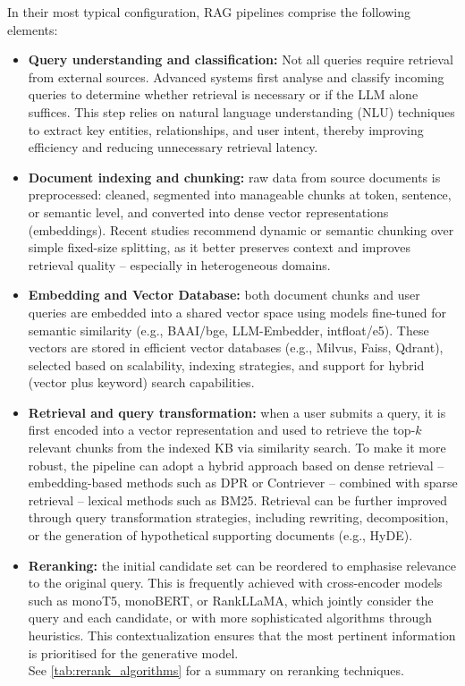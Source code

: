 \begin{spacing}{1.5}
In their most typical configuration, RAG pipelines comprise the following elements:
\begin{itemize}
  \item \textbf{Query understanding and classification:} Not all queries require retrieval from external sources. Advanced systems first analyse and classify incoming queries to determine whether retrieval is necessary or if the LLM alone suffices. This step relies on natural language understanding (NLU) techniques to extract key entities, relationships, and user intent, thereby improving efficiency and reducing unnecessary retrieval latency.
    \item \textbf{Document indexing and chunking:} raw data from source documents is preprocessed: cleaned, segmented into manageable chunks at token, sentence, or semantic level, and converted into dense vector representations (embeddings). Recent studies recommend dynamic or semantic chunking over simple fixed-size splitting, as it better preserves context and improves retrieval quality -- especially in heterogeneous domains.
    \item \textbf{Embedding and Vector Database:} both document chunks and user queries are embedded into a shared vector space using models fine-tuned for semantic similarity (e.g., BAAI/bge, LLM-Embedder, intfloat/e5). These vectors are stored in efficient vector databases (e.g., Milvus, Faiss, Qdrant), selected based on scalability, indexing strategies, and support for hybrid (vector plus keyword) search capabilities.
    \item \textbf{Retrieval and query transformation:} when a user submits a query, it is first encoded into a vector representation and used to retrieve the top-$k$ relevant chunks from the indexed KB via similarity search. To make it more robust, the pipeline can adopt a hybrid approach based on dense retrieval -- embedding-based methods such as DPR or Contriever -- combined with sparse retrieval -- lexical methods such as BM25. Retrieval can be further improved through query transformation strategies, including rewriting, decomposition, or the generation of hypothetical supporting documents (e.g., HyDE).
    \item \textbf{Reranking:} the initial candidate set can be reordered to emphasise relevance to the original query. This is frequently achieved with cross-encoder models such as monoT5, monoBERT, or RankLLaMA, which jointly consider the query and each candidate, or with more sophisticated algorithms through heuristics. This contextualization ensures that the most pertinent information is prioritised for the generative model.\\See \autoref{tab:rerank_algorithms} for a summary on reranking techniques.

\end{itemize}
\end{spacing}
